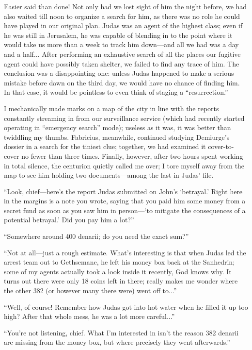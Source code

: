 Easier said than done! Not only had we lost sight of him the night before, we had also waited till noon to organize a search for him, as there was no role he could have played in our original plan. Judas was an agent of the highest class; even if he was still in Jerusalem, he was capable of blending in to the point where it would take us more than a week to track him down---and all we had was a day and a half... After performing an exhaustive search of all the places our fugitive agent could have possibly taken shelter, we failed to find any trace of him. The conclusion was a disappointing one: unless Judas happened to make a serious mistake before dawn on the third day, we would have no chance of finding him. In that case, it would be pointless to even think of staging a ``resurrection.''

I mechanically made marks on a map of the city in line with the reports constantly streaming in from our surveillance service (which had recently started operating in ``emergency search'' mode); useless as it was, it was better than twiddling my thumbs. Fabricius, meanwhile, continued studying Demiurge's dossier in a search for the tiniest clue; together, we had examined it cover-to-cover no fewer than three times. Finally, however, after two hours spent working in total silence, the centurion quietly called me over; I tore myself away from the map to see him holding two documents---among the last in Judas' file.

``Look, chief---here's the report Judas submitted on John's `betrayal.' Right here in the margins is a note you wrote, saying that you paid him some money from a secret fund as soon as you saw him in person---`to mitigate the consequences of a potential betrayal.' Did you pay him a lot?''

``Somewhere around 400 denarii; do you need the exact sum?'' 

``Not at all---just a rough estimate. What's interesting is that when Judas led the arrest team out to Gethsemane, he left his money box back at the Sanhedrin; some of my agents actually took a look inside it recently, God knows why. It turns out there were only 18 coins left in there; really makes me wonder where the other 382 (or however many there were) went off to...''

``Well, of course! Remember how Judas got into hot water when he filled it up too high? After that whole mess, he was a lot more careful...''

``You're not listening, chief. What I'm interested in isn't the reason 382 denarii are missing from the money box, but where precisely they went afterwards.''

